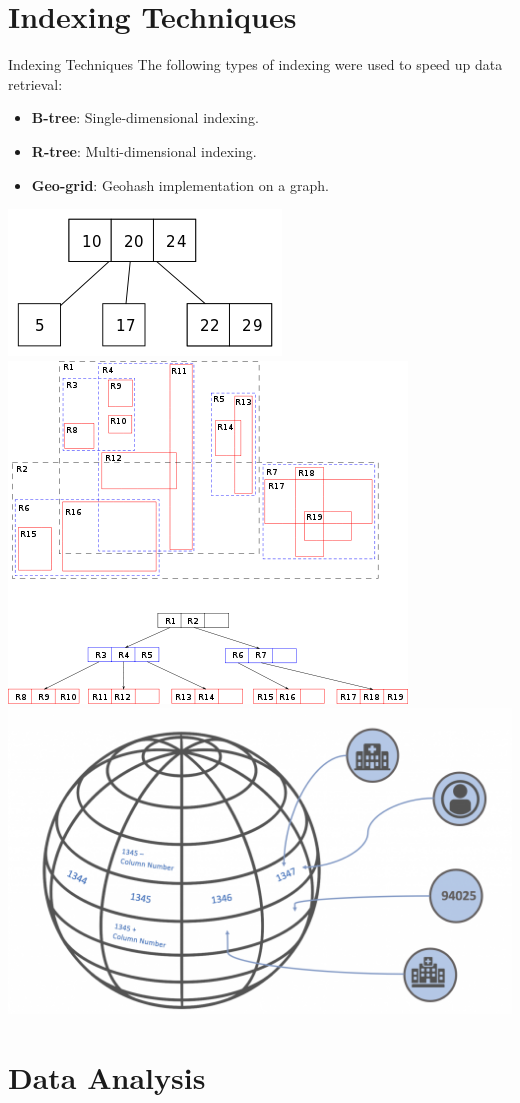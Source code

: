 \section{Indexing Techniques}

\begin{frame}{Indexing Techniques}
    The following types of indexing were used to speed up data retrieval:
    \vfill
    \begin{itemize}
        \item \textbf{B-tree}: Single-dimensional indexing.
        \item \textbf{R-tree}: Multi-dimensional indexing.
        \item \textbf{Geo-grid}: Geohash implementation on a graph.
    \end{itemize}
    \vfill
    \includegraphics[width=.25\textwidth]{img/index/btree.png}
    \hfill
    \includegraphics[width=.35\textwidth]{img/index/400px-R-tree.png}
    \hfill
    \includegraphics[width=.35\textwidth]{img/index/geogrid.png}
\end{frame}

\section{Data Analysis}

